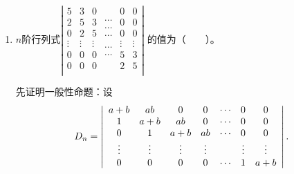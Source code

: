 \begin{enumerate}[1~]
\begin{enumerate}[1.~]
\item 
$n$阶行列式$\left| \begin{array}{c}
	5\\
	2\\
	0\\
	\vdots\\
	0\\
	0\\
\end{array}\begin{array}{c}
	3\\
	5\\
	2\\
	\vdots\\
	0\\
	0\\
\end{array}\begin{array}{c}
	0\\
	3\\
	5\\
	\vdots\\
	0\\
	0\\
\end{array}\begin{array}{c}
	\cdots\\
	\cdots\\
	\cdots\\
	\\
	\cdots\\
	\cdots\\
\end{array}\begin{array}{c}
	0\\
	0\\
	0\\
	\vdots\\
	5\\
	2\\
\end{array}\begin{array}{c}
	0\\
	0\\
	0\\
	\vdots\\
	3\\
	5\\
\end{array} \right|
$
的值为（\ \ \ \ ）。
\begin{solution}
先证明一般性命题：设\[
D _ { n } = \left| \begin{array} { c c c c c c c } { a + b } & { a b } & { 0 } & { 0 } & { \cdots } & { 0 } & { 0 } \\ { 1 } & { a + b } & { a b } & { 0 } & { \cdots } & { 0 } & { 0 } \\ { 0 } & { 1 } & { a + b } & { a b } & { \cdots } & { 0 } & { 0 } \\ { \vdots } & { \vdots } & { \vdots } & { \vdots } & { } & { \vdots } & { \vdots } \\ { 0 } & { 0 } & { 0 } & { 0 } & { \cdots } & { 1 } & { a + b } \end{array} \right|.
\]
\end{solution}
\end{enumerate}
\end{enumerate}
